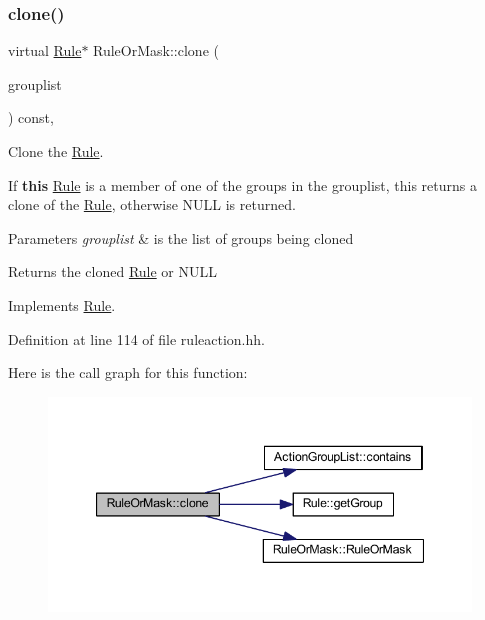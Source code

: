 \subsubsection{\texorpdfstring{clone()}{clone()}}
{\footnotesize\ttfamily virtual \mbox{\hyperlink{class_rule}{Rule}}$\ast$ Rule\+Or\+Mask\+::clone (\begin{DoxyParamCaption}\item[{const \mbox{\hyperlink{class_action_group_list}{Action\+Group\+List}} \&}]{grouplist }\end{DoxyParamCaption}) const\hspace{0.3cm}{\ttfamily [inline]}, {\ttfamily [virtual]}}



Clone the \mbox{\hyperlink{class_rule}{Rule}}. 

If {\bfseries{this}} \mbox{\hyperlink{class_rule}{Rule}} is a member of one of the groups in the grouplist, this returns a clone of the \mbox{\hyperlink{class_rule}{Rule}}, otherwise N\+U\+LL is returned. 
\begin{DoxyParams}{Parameters}
{\em grouplist} & is the list of groups being cloned \\
\hline
\end{DoxyParams}
\begin{DoxyReturn}{Returns}
the cloned \mbox{\hyperlink{class_rule}{Rule}} or N\+U\+LL 
\end{DoxyReturn}


Implements \mbox{\hyperlink{class_rule_a70de90a76461bfa7ea0b575ce3c11e4d}{Rule}}.



Definition at line 114 of file ruleaction.\+hh.

Here is the call graph for this function\+:
\nopagebreak
\begin{figure}[H]
\begin{center}
\leavevmode
\includegraphics[width=347pt]{class_rule_or_mask_a3e58258633ca9f6a88262b88b95672a1_cgraph}
\end{center}
\end{figure}
\mbox{\label{class_rule_or_mask_a6261fe302ae9f251cfe27056e702fe49}} 
